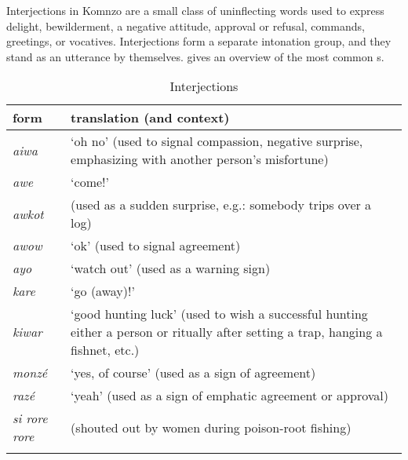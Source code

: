 Interjections in Komnzo are a small class of uninflecting words used to express delight, bewilderment, a negative attitude, approval or refusal, commands, greetings, or vocatives. Interjections form a separate intonation group, and they stand as an utterance by themselves.  gives an overview of the most common s.

\begin{table}
\caption{Interjections}
\label{interjections}
	\begin{tabularx}{\textwidth}{Xp{}}
		\lsptoprule
		{form}&{translation (and context)}\\\midrule
		\emph{aiwa}&`oh no' (used to signal compassion, negative surprise, emphasizing with another person's misfortune)\\
		\emph{awe}&`come!'\\
		\emph{awkot}& (used as a sudden surprise, e.g.: somebody trips over a log)\\
		\emph{awow}&`ok' (used to signal agreement)\\
		\emph{ayo}&`watch out' (used as a warning sign)\\
		\emph{kare}&`go (away)!'\\
		\emph{kiwar}&`good hunting luck' (used to wish a successful hunting either a person or ritually after setting a trap, hanging a fishnet, etc.)\\
		\emph{monzé}&`yes, of course' (used as a sign of agreement)\\
		\emph{razé}&`yeah' (used as a sign of emphatic agreement or approval)\\
		\emph{si rore rore}& (shouted out by women during poison-root fishing)\\
		\lspbottomrule
	\end{tabularx}
\end{table}%